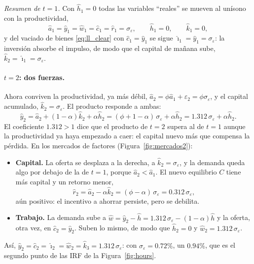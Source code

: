 \documentclass[11pt,a4paper]{report}
\begin{document}
\emph{Resumen de $t=1$.} Con $\hat{h}_1=0$ todas las variables ``reales'' se mueven
al unísono con la productividad,
\[
\hat{a}_1=\hat{y}_1=\hat{w}_1=\hat{c}_1=\hat{r}_1=\sigma_\varepsilon,\qquad \hat{h}_1=0,\qquad \hat{k}_1=0,
\]
y del vaciado de bienes \eqref{eq:ll_clear} con $\hat{c}_1=\hat{y}_1$ se sigue
$\hat{\imath}_1=\hat{y}_1=\sigma_\varepsilon$: la inversión absorbe el impulso, de modo
que el capital de mañana sube, $\hat{k}_2=\hat{\imath}_1=\sigma_\varepsilon$.

\paragraph{$t=2$: dos fuerzas.} Ahora conviven la productividad, ya más débil,
$\hat{a}_2=\phi\hat{a}_1+\varepsilon_2=\phi\sigma_\varepsilon$, y el capital acumulado,
$\hat{k}_2=\sigma_\varepsilon$. El producto responde a ambas:
\[
\hat{y}_2=\hat{a}_2+(1-\alpha)\hat{k}_2+\alpha\hat{h}_2
=(\phi+1-\alpha)\,\sigma_\varepsilon+\alpha\hat{h}_2
=1.312\,\sigma_\varepsilon+\alpha\hat{h}_2 .
\]
El coeficiente $1.312>1$ dice que el producto de $t=2$ supera al de $t=1$ aunque la
productividad ya haya empezado a caer: el capital nuevo más que compensa la
pérdida. En los mercados de factores (Figura~\ref{fig:mercados2}):
\begin{itemize}[nosep,leftmargin=1.4em]
\item \textbf{Capital.} La oferta se desplaza a la derecha, a $\hat{k}_2=\sigma_\varepsilon$,
  y la demanda queda algo por debajo de la de $t=1$, porque $\hat{a}_2<\hat{a}_1$. El
  nuevo equilibrio $C$ tiene más capital y un retorno menor,
  \[
  \hat{r}_2=\hat{a}_2-\alpha\hat{k}_2=(\phi-\alpha)\,\sigma_\varepsilon=0.312\,\sigma_\varepsilon ,
  \]
  aún positivo: el incentivo a ahorrar persiste, pero se debilita.
\item \textbf{Trabajo.} La demanda sube a $\hat{w}=\hat{y}_2-\hat{h}=1.312\,\sigma_\varepsilon
  -(1-\alpha)\hat{h}$ y la oferta, otra vez, en $\hat{c}_2=\hat{y}_2$. Suben lo mismo, de
  modo que $\hat{h}_2=0$ y $\hat{w}_2=1.312\,\sigma_\varepsilon$.
\end{itemize}
Así, $\hat{y}_2=\hat{c}_2=\hat{\imath}_2=\hat{w}_2=\hat{k}_3=1.312\,\sigma_\varepsilon$:
con $\sigma_\varepsilon=0.72\%$, un $0.94\%$, que es el segundo punto de las IRF de la
Figura~\ref{fig:hours}.
\end{document}
